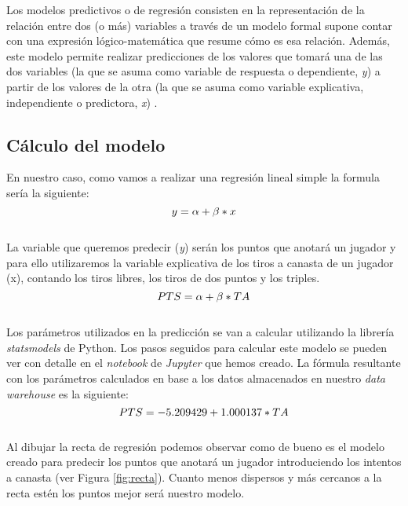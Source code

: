 \documentclass[11pt]{diazessay} %
\begin{document}
Los modelos predictivos o de regresión consisten en la representación de la relación entre dos (o más) variables a través de un modelo formal supone contar con una expresión lógico-matemática que resume cómo es esa relación. Además, este modelo permite realizar predicciones de los valores que tomará una de las dos variables (la que se asuma como variable de respuesta o dependiente, \textit{y}) a partir de los valores de la otra (la que se asuma como variable explicativa, independiente o predictora, \textit{x}) \cite{modelo_regresion}.\\

\subsection*{Cálculo del modelo}

En nuestro caso, como vamos a realizar una regresión lineal simple la formula sería la siguiente:\\

\begin{equation}
\centering
y = \alpha + \beta * x
\end{equation}
\\
La variable que queremos predecir (\textit{y}) serán los puntos que anotará un jugador y para ello utilizaremos la variable explicativa de los tiros a canasta de un jugador (x), contando los tiros libres, los tiros de dos puntos y los triples. \\

\begin{equation}
\centering
PTS = \alpha + \beta * TA
\end{equation}
\\
Los parámetros utilizados en la predicción se van a calcular utilizando la librería \textit{statsmodels} \cite{statsmodels} de Python. Los pasos seguidos para calcular este modelo se pueden ver con detalle en el \textit{notebook} de \textit{Jupyter} \cite{jupyter} que hemos creado. La fórmula resultante con los parámetros calculados en base a los datos almacenados en nuestro \textit{data warehouse} es la siguiente:\\
\begin{equation}
\centering
PTS = -5.209429 + 1.000137 * TA
\end{equation}
\\
Al dibujar la recta de regresión \cite{recta} podemos observar como de bueno es el modelo creado para predecir los puntos que anotará un jugador introduciendo los intentos a canasta (ver Figura \ref{fig:recta}). Cuanto menos dispersos y más cercanos a la recta estén los puntos mejor será nuestro modelo.
\end{document}
